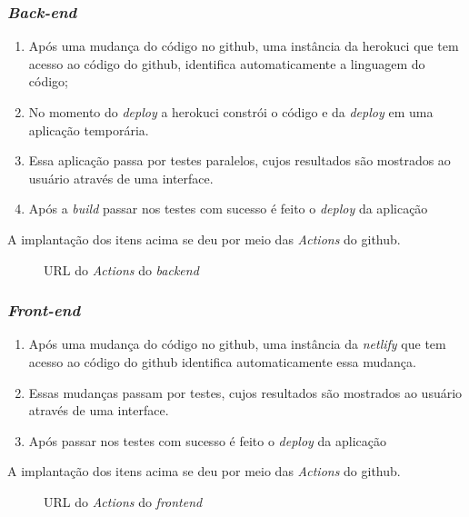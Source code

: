 \subsubsection{\textit{Back-end}}

\begin{enumerate}
    \item Após uma mudança do código no \gls{github}, uma instância da \gls{herokuci} que tem acesso ao código do \gls{github}, identifica automaticamente
    a linguagem do código; 
    \item No momento do \textit{\gls{deploy}} a \gls{herokuci} constrói o código e da \textit{\gls{deploy}} em uma aplicação temporária.
    \item Essa aplicação passa por testes paralelos, cujos resultados são mostrados ao usuário através de uma interface.
    \item Após a \textit{build} passar nos testes com sucesso é feito o \textit{\gls{deploy}} da aplicação 
\end{enumerate} 

A implantação dos itens acima se deu por meio das \textit{Actions} do \gls{github}.

\begin{figure}[htb]
	\caption{\label{qr-url-actions-back}URL do \textit{Actions} do \textit{\gls{backend}}}
	\begin{center}
	\end{center}
\end{figure}

\subsubsection{\textit{Front-end}}
\begin{enumerate}
    \item Após uma mudança do código no \gls{github}, uma instância da \textit{\gls{netlify}} que tem acesso ao código do \gls{github} identifica automaticamente essa mudança.
    \item Essas mudanças passam por testes, cujos resultados são mostrados ao usuário através de uma interface.
    \item Após passar nos testes com sucesso é feito o \textit{\gls{deploy}} da aplicação 
\end{enumerate} 

A implantação dos itens acima se deu por meio das \textit{Actions} do \gls{github}.
\begin{figure}[htb]
	\caption{\label{qr-url-actions-front}URL do \textit{Actions} do \textit{\gls{frontend}}}
	\begin{center}
	\end{center}
\end{figure}